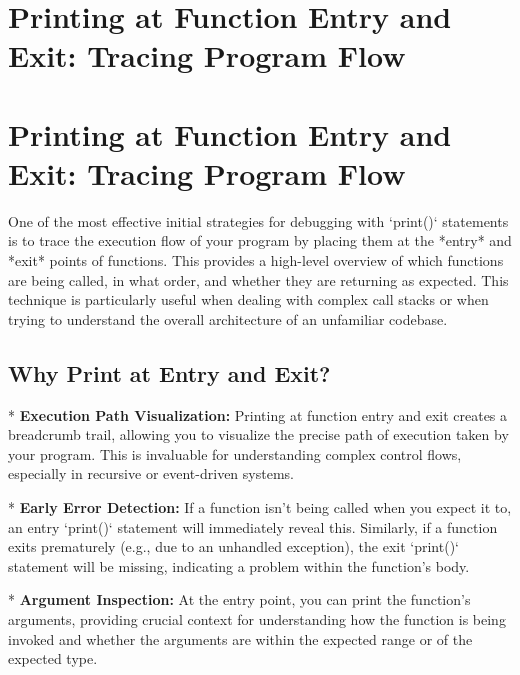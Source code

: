 \documentclass{article}
\begin{document}

\section*{Printing at Function Entry and Exit: Tracing Program Flow} %
\label{chapter-3-1-Printing_at_Function_Entry_and_Exit__Tra}

\section*{Printing at Function Entry and Exit: Tracing Program Flow}

One of the most effective initial strategies for debugging with `print()` statements is to trace the execution flow of your program by placing them at the *entry* and *exit* points of functions. This provides a high-level overview of which functions are being called, in what order, and whether they are returning as expected. This technique is particularly useful when dealing with complex call stacks or when trying to understand the overall architecture of an unfamiliar codebase.

\subsection*{Why Print at Entry and Exit?}

*   \textbf{Execution Path Visualization:} Printing at function entry and exit creates a breadcrumb trail, allowing you to visualize the precise path of execution taken by your program. This is invaluable for understanding complex control flows, especially in recursive or event-driven systems.

*   \textbf{Early Error Detection:} If a function isn't being called when you expect it to, an entry `print()` statement will immediately reveal this. Similarly, if a function exits prematurely (e.g., due to an unhandled exception), the exit `print()` statement will be missing, indicating a problem within the function's body.

*   \textbf{Argument Inspection:} At the entry point, you can print the function's arguments, providing crucial context for understanding how the function is being invoked and whether the arguments are within the expected range or of the expected type.
\end{document}
